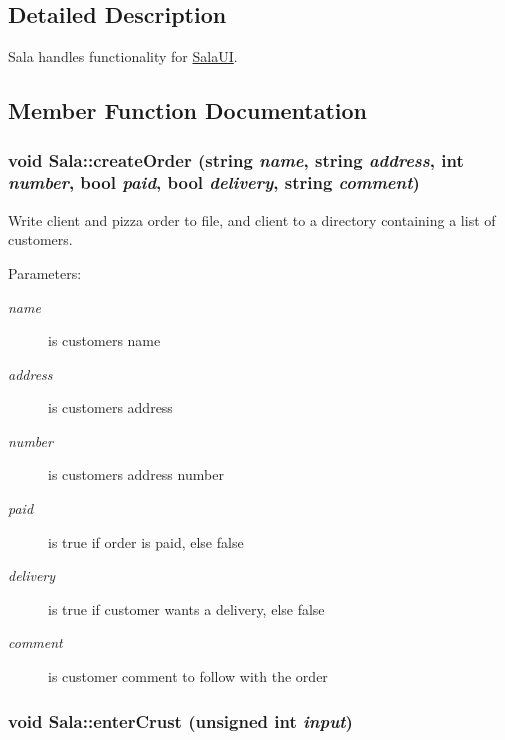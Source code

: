 \subsection{Detailed Description}
Sala handles functionality for \hyperlink{class_sala_u_i}{Sala\-UI}. 



\subsection{Member Function Documentation}
\hypertarget{class_sala_554463c0b82fb266c21e23e040bf1ac0}{
\subsubsection[createOrder]{\setlength{\rightskip}{0pt plus 5cm}void Sala::create\-Order (string {\em name}, string {\em address}, int {\em number}, bool {\em paid}, bool {\em delivery}, string {\em comment})}}
\label{class_sala_554463c0b82fb266c21e23e040bf1ac0}


Write client and pizza order to file, and client to a directory containing a list of customers. 

\begin{Desc}
\item[Parameters:]
\begin{description}
\item[{\em name}]is customers name \item[{\em address}]is customers address \item[{\em number}]is customers address number \item[{\em paid}]is true if order is paid, else false \item[{\em delivery}]is true if customer wants a delivery, else false \item[{\em comment}]is customer comment to follow with the order \end{description}
\end{Desc}
\hypertarget{class_sala_ae3b8375ca0ab5b62e84f86582b8cec3}{
\subsubsection[enterCrust]{\setlength{\rightskip}{0pt plus 5cm}void Sala::enter\-Crust (unsigned int {\em input})}}
\label{class_sala_ae3b8375ca0ab5b62e84f86582b8cec3}


